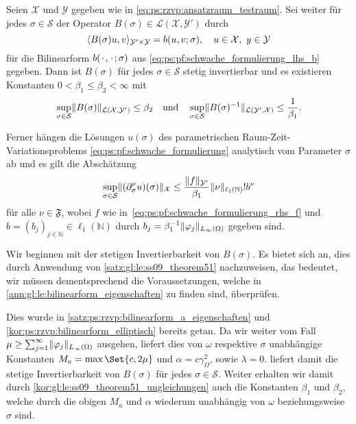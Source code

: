 \begin{Satz}
\label{satz:ps:rg:kunoth13_theorem21}
    Seien $\mathcal X$ und $\mathcal Y$ gegeben wie in \cref{eq:ps:rzvp:ansatzraum_testraum}.
    Sei weiter für jedes $\sigma \in \mathcal S$ der Operator $B(\sigma) \in \mathcal L(\mathcal X, \mathcal Y')$ durch
    \begin{equation}
        \langle B(\sigma) u,v\rangle_{\mathcal Y' \times \mathcal Y} = b(u, v; \sigma), \quad u \in \mathcal X,~y \in \mathcal Y
    \end{equation}
    für die Bilinearform $b({\mkern2mu\cdot\mkern2mu}, {\mkern2mu\cdot\mkern2mu}; \sigma)$ aus \cref{eq:ps:pf:schwache_formulierung_lhs_b} gegeben.
    Dann ist $B(\sigma)$ für jedes $\sigma \in \mathcal S$ stetig invertierbar und es existieren Konstanten $0 < \beta_{1} \leq \beta_{2} < \infty$ mit
    \begin{equation}
        \label{eq:ps:rg:theorem21_abschaetzungen_normen_B_und_B_inv_parametrisch}
        \sup_{\sigma \in \mathcal S} \lVert B(\sigma)\rVert_{\mathcal L(\mathcal X, \mathcal Y')} \leq \beta_{2} \quad \text{und} \quad  \sup_{\sigma \in \mathcal S} \lVert B(\sigma)^{-1}\rVert_{\mathcal L(\mathcal Y', \mathcal X)} \leq \frac{1}{\beta_{1}}.
    \end{equation}

    Ferner hängen die Lösungen $u(\sigma)$ des parametrischen Raum-Zeit-Variationsproblems \cref{eq:ps:pf:schwache_formulierung} analytisch vom Parameter $\sigma$ ab und es gilt die Abschätzung
    \begin{equation}
        \label{eq:ps:rg:theorem21_apriori_schranke}
        \sup_{\sigma \in \mathcal S} \lVert(\partial^{\nu}_{\sigma} u)(\sigma)\rVert_{\mathcal X} \leq \frac{\lVert f\rVert_{\mathcal Y'}}{\beta_{1}} \lVert\nu\rVert_{\ell_{1}(\mathbb{N})}! b^{\nu}
    \end{equation}
    für alle $\nu \in \mathfrak F$, wobei $f$ wie in~\cref{eq:ps:pf:schwache_formulierung_rhs_f} und $b = (b_{j})_{j \in \mathbb{N}} \in \ell_{1}(\mathbb{N})$ durch $b_{j} = \beta_{1}^{-1} \lVert\varphi_{j}\rVert_{L_{\infty}(\Omega)}$ gegeben sind.

    \begin{Beweis}
        Wir beginnen mit der stetigen Invertierbarkeit von $B(\sigma)$.
        Es bietet sich an, dies durch Anwendung von \cref{satz:gl:le:ss09_theorem51} nachzuweisen, das bedeutet, wir müssen dementsprechend die Voraussetzungen, welche in \cref{ann:gl:le:bilinearform_eigenschaften} zu finden sind, überprüfen.

        Dies wurde in \cref{satz:ps:rzvp:bilinearform_a_eigenschaften} und \cref{kor:ps:rzvp:bilinearform_elliptisch} bereits getan.
        Da wir weiter vom Fall $\mu \geq \sum_{j = 1}^{\infty} \lVert\varphi_{j}\rVert_{L_{\infty}(\Omega)}$ ausgehen, liefert dies von $\omega$ respektive $\sigma$ unabhängige Konstanten $M_{a} = \max\Set{c, 2 \mu}$ und $\alpha = c \gamma_{\Omega}^{2}$, sowie $\lambda = 0$.
         liefert damit die stetige Invertierbarkeit von $B(\sigma)$ für jedes $\sigma \in \mathcal S$.
        Weiter erhalten wir damit durch \cref{kor:gl:le:ss09_theorem51_ungleichungen} auch die Konstanten $\beta_{1}$ und $\beta_{2}$, welche durch die obigen $M_{a}$ und $\alpha$ wiederum unabhängig von $\omega$ beziehungsweise $\sigma$ sind.


\end{Beweis}
\end{Satz}
